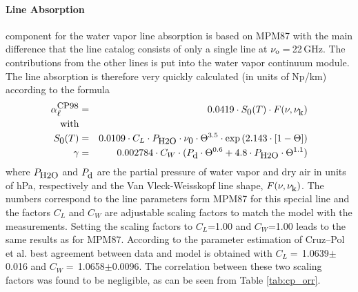 \paragraph{Line Absorption}
\label{levele:cp98_h2oline}
component \citep{cruzpol:98} for the water vapor line absorption 
is based on MPM87 with the main difference that the 
line catalog consists of only a single line at $\nu_{\rm o}=$\,22\,GHz. 
The contributions from the other lines is put into the water vapor 
continuum module. The line absorption is therefore very quickly 
calculated (in units of Np/km) according to the formula
\begin{eqnarray}
  \label{eq:cp98:lineabs}
  \alphacpl &=& 0.0419 \cdot \intencp \cdot \shape \\
  \mbox{with} & & \nonumber\\
  \label{eq:cp98:inten}
  \intencp    &=& 0.0109 \cdot C_L \cdot \phzo \cdot \nuo \cdot \Theta^{3.5} 
             \cdot \exp{(2.143\cdot[1-\Theta])}\nonumber\\
%
  \label{eq:cp98:width}
  \gamma &=& 0.002784 \cdot C_W \cdot (\pda \cdot \Theta^{0.6}+ 
             4.8 \cdot \phzo \cdot \Theta^{1.1}) \nonumber\\
\end{eqnarray}
where $P_{\mbox{\rm \small H2O}}$ and $P_{\mbox{\rm \small d}}$ are the partial pressure of water vapor and dry
air in units of hPa, respectively and the Van Vleck-Weisskopf line
shape, $F(\nu,\nu_{\mbox{\rm \small k}})$. The numbers correspond to the line
parameters form MPM87 for this special line and the factors  
$C_L$ and $C_W$ are adjustable scaling factors to match the model with the
measurements. Setting the scaling factors to $C_L$=1.00 and $C_W$=1.00 
leads to the same results as for MPM87. According to the parameter 
estimation of Cruz--Pol et al. best agreement between 
data and model is obtained with $C_L=$\,1.0639$\pm$0.016 and 
$C_W=$\,1.0658$\pm$0.0096. The correlation between these two scaling 
factors was found to be negligible, as can be seen from 
Table \ref{tab:cp_orr}.

